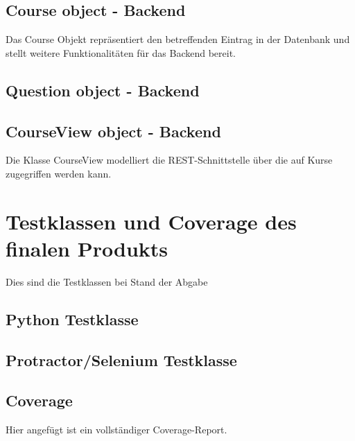 \documentclass[accentcolor=tud0b,12pt,paper=a4]{tudreport}
\begin{document}
\section*{Course object - Backend}
Das Course Objekt repräsentiert den betreffenden Eintrag in der Datenbank und stellt weitere Funktionalitäten für das Backend bereit.



\section*{Question object - Backend} 



\section*{CourseView object - Backend}
Die Klasse CourseView modelliert die REST-Schnittstelle über die auf Kurse zugegriffen werden kann.



\chapter{Testklassen und Coverage des finalen Produkts}

Dies sind die Testklassen bei Stand der Abgabe

\section{Python Testklasse}


\section{Protractor/Selenium Testklasse}


\section{Coverage}
Hier angefügt ist ein vollständiger Coverage-Report.








\end{document}
